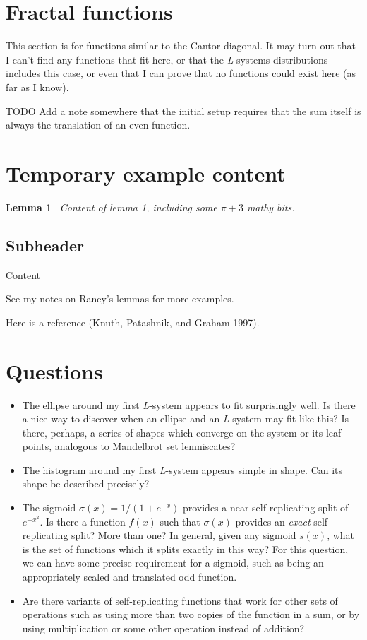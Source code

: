 \documentclass[20pt,]{extarticle}
\providecommand{\tightlist}{%
  \setlength{\itemsep}{0pt}\setlength{\parskip}{0pt}}
\begin{document}
\section{Fractal functions}\label{fractal-functions}

This section is for functions similar to the Cantor diagonal. It may
turn out that I can't find any functions that fit here, or that the
\emph{L}-systems distributions includes this case, or even that I can
prove that no functions could exist here (as far as I know).

TODO Add a note somewhere that the initial setup requires that the sum
itself is always the translation of an even function.

\section{Temporary example content}\label{temporary-example-content}

\textbf{Lemma 1}~ \emph{Content of lemma 1, including some \(\pi+3\)
mathy bits.}

\subsection{Subheader}\label{subheader}

Content

See my notes on Raney's lemmas for more examples.

Here is a reference (Knuth, Patashnik, and Graham 1997).

\section{Questions}\label{questions}

\begin{itemize}
\tightlist
\item
  The ellipse around my first \emph{L}-system appears to fit
  surprisingly well. Is there a nice way to discover when an ellipse and
  an \emph{L}-system may fit like this? Is there, perhaps, a series of
  shapes which converge on the system or its leaf points, analogous to
  \href{http://mathworld.wolfram.com/MandelbrotSetLemniscate.html}{Mandelbrot
  set lemniscates}?
\item
  The histogram around my first \emph{L}-system appears simple in shape.
  Can its shape be described precisely?
\item
  The sigmoid \(\sigma(x)=1/(1+e^{-x})\) provides a
  near-self-replicating split of \(e^{-x^2}\). Is there a function
  \(f(x)\) such that \(\sigma(x)\) provides an \emph{exact}
  self-replicating split? More than one? In general, given any sigmoid
  \(s(x)\), what is the set of functions which it splits exactly in this
  way? For this question, we can have some precise requirement for a
  sigmoid, such as being an appropriately scaled and translated odd
  function.
\item
  Are there variants of self-replicating functions that work for other
  sets of operations such as using more than two copies of the function
  in a sum, or by using multiplication or some other operation instead
  of addition?
\end{itemize}
\end{document}
